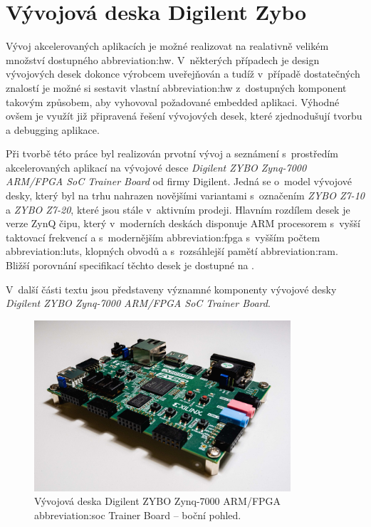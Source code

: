 \documentclass[a4paper, twoside, 11pt]{article}
\begin{document}
	

	\section{Vývojová deska Digilent Zybo}\label{sec:vyvojova-deska-digilent-zybo}
			Vývoj akcelerovaných aplikacích je možné realizovat na realativně velikém množství dostupného \gls{abbreviation:hw}. V~některých případech je design vývojových desek dokonce výrobcem uveřejňován a tudíž v~případě dostatečných znalostí je možné si sestavit vlastní \gls{abbreviation:hw} z~dostupných komponent takovým způsobem, aby vyhovoval požadované embedded aplikaci. Výhodné ovšem je využít již připravená řešení vývojových desek, které zjednodušují tvorbu a debugging aplikace.\par
			Při tvorbě této práce byl realizován prvotní vývoj a seznámení s~prostředím akcelerovaných aplikací na vývojové desce \textit{Digilent ZYBO Zynq-7000 ARM/FPGA SoC Trainer Board} od firmy Digilent. \cite{digilent-zybo-7000-docs} Jedná se o~model vývojové desky, který byl na trhu nahrazen novějšími variantami s~označením \textit{ZYBO Z7-10} a \textit{ZYBO Z7-20}, které jsou stále v~aktivním prodeji. Hlavním rozdílem desek je verze ZynQ čipu, který v~moderních deskách disponuje ARM procesorem s~vyšší taktovací frekvencí a s~modernějším \gls{abbreviation:fpga} s~vyšším počtem \gls{abbreviation:luts}, klopných obvodů a s~rozsáhlejší pamětí \gls{abbreviation:ram}. Bližší porovnání specifikací těchto desek je dostupné na \cite{digilent-zybo-compare}.\par
			V~další části textu jsou představeny významné komponenty vývojové desky \textit{Digilent ZYBO Zynq-7000 ARM/FPGA SoC Trainer Board}.

			\begin{figure}[htbp!]
				\centering
					\includegraphics[width=0.85\textwidth]{src/jpg/digilent-zybo-foto-2.jpeg} 
					\caption{Vývojová deska Digilent ZYBO Zynq-7000 ARM/FPGA \gls{abbreviation:soc} Trainer Board – boční pohled.}
					\label{fig:digilent-zybo-foto-2}
			\end{figure}
\end{document}
